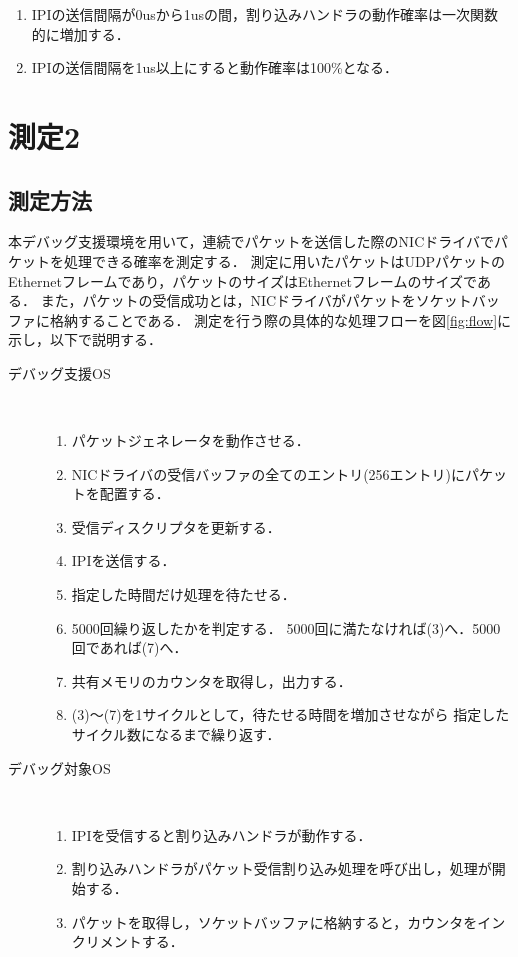 \documentclass[12pt]{jsarticle}
\def\labelenumi{(\theenumi)}
\begin{document}
\begin{enumerate}
    \item IPIの送信間隔が0usから1usの間，割り込みハンドラの動作確率は一次関数
        的に増加する．
    \item IPIの送信間隔を1us以上にすると動作確率は100\%となる．
\end{enumerate}

\section{測定2}

\subsection{測定方法}\label{method-measure}

本デバッグ支援環境を用いて，連続でパケットを送信した際のNICドライバでパケットを処理できる確率を測定する．
測定に用いたパケットはUDPパケットのEthernetフレームであり，パケットのサイズはEthernetフレームのサイズである．
また，パケットの受信成功とは，NICドライバがパケットをソケットバッファに格納することである．
測定を行う際の具体的な処理フローを図\ref{fig:flow}に示し，以下で説明する．
\begin{description}
    \item[デバッグ支援OS]~\\
        \begin{enumerate}
            \item パケットジェネレータを動作させる．
            \item NICドライバの受信バッファの全てのエントリ(256エントリ)にパケットを配置する．
            \item 受信ディスクリプタを更新する．
            \item IPIを送信する．
            \item 指定した時間だけ処理を待たせる．
            \item 5000回繰り返したかを判定する．
                5000回に満たなければ(3)へ．5000回であれば(7)へ．
            \item 共有メモリのカウンタを取得し，出力する．
            \item (3)〜(7)を1サイクルとして，待たせる時間を増加させながら
                指定したサイクル数になるまで繰り返す．
        \end{enumerate}
    \item[デバッグ対象OS]~\\
        \begin{enumerate}
        \renewcommand{\labelenumi}{(\Alph{enumi})}
            \item IPIを受信すると割り込みハンドラが動作する．
            \item 割り込みハンドラがパケット受信割り込み処理を呼び出し，処理が開始する．
            \item パケットを取得し，ソケットバッファに格納すると，カウンタをインクリメントする．
        \end{enumerate}
\end{description}
\end{document}
